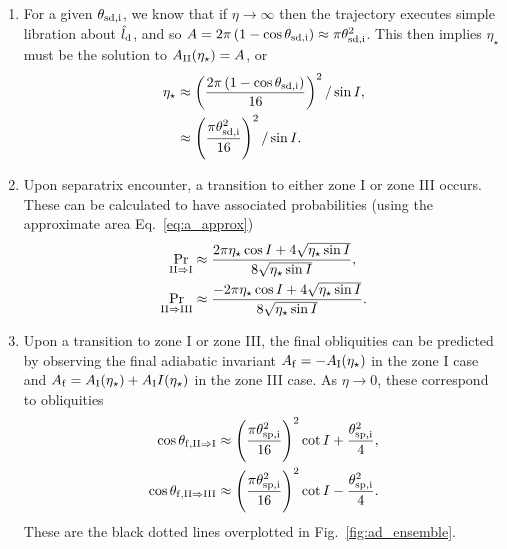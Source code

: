 \documentclass[
        fleqn,
        usenatbib,
        referee,
    ]{mnras}
\newcommand*{\p}[1]{\left(#1\right)}
\begin{document}
\begin{enumerate}
    \item For a given $\theta_{\rm sd, i}$, we know that if $\eta \to \infty$
        then the trajectory executes simple libration about $\hat{l}_{\rm d}$,
        and so $A = 2\pi\p{1 - \cos \theta_{\rm sd, i}} \approx \pi \theta_{\rm
        sd, i}^2$. This then implies $\eta_\star$ must be the solution to
        $A_{\rm II}(\eta_\star) = A$, or
        \begin{align}
            \eta_\star &\approx \p{\frac{2\pi\p{1 - \cos \theta_{\rm sd,i}}}{
                        16}}^2 / \sin I,\\
                    &\approx \p{\frac{\pi \theta_{\rm sd, i}^2}{16}}^2/\sin I.
        \end{align}

    \item Upon separatrix encounter, a transition to either zone I or zone
        III occurs. These can be calculated to have associated probabilities
        (using the approximate area Eq.~\eqref{eq:a_approx})
        \begin{subequations}
            \begin{align}
                \Pr_{\rm II \Rightarrow I} &\approx \frac{2\pi
                    \eta_{\star} \cos I + 4\sqrt{\eta_{\star}\sin
                    I}}{8\sqrt{\eta_{\star}\sin I}},\\
                \Pr_{\rm II \Rightarrow III} &\approx \frac{-2\pi
                    \eta_{\star} \cos I + 4\sqrt{\eta_{\star}\sin
                    I}}{8\sqrt{\eta_{\star}\sin I}}.
            \end{align}
        \end{subequations}

    \item Upon a transition to zone I or zone III, the final obliquities can
        be predicted by observing the final adiabatic invariant $A_{\rm f} = -A_{\rm
        I}(\eta_\star)$ in the zone I case and $A_{\rm f} = A_{\rm I}(\eta_\star) +
        A_{\rm I}I(\eta_\star)$ in the zone III case. As $\eta \to 0$, these
        correspond to obliquities
        \begin{subequations}\label{se:q_f_approx}
            \begin{align}
                \cos \theta_{\rm f, II \Rightarrow I} &\approx
                    \p{\frac{\pi \theta_{\rm sp, i}^2}{16}}^2 \cot I
                        + \frac{\theta_{\rm sp, i}^2}{4},\\
                \cos \theta_{\rm f, II \Rightarrow III} &\approx
                    \p{\frac{\pi \theta_{\rm sp, i}^2}{16}}^2 \cot I
                        - \frac{\theta_{\rm sp, i}^2}{4}.
            \end{align}
        \end{subequations}
        These are the black dotted lines overplotted in
        Fig.~\ref{fig:ad_ensemble}.
\end{enumerate}
\end{document}
